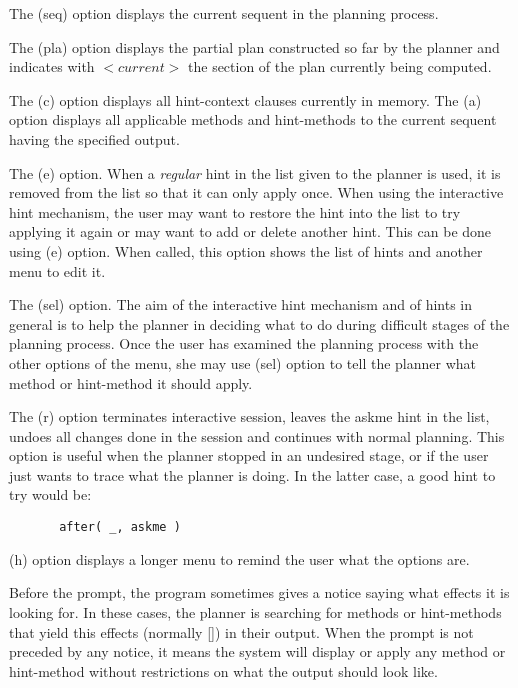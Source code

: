         The (seq) option displays the current sequent in the planning
process.

        
        The (pla) option displays the partial plan constructed so far
by the planner and indicates with $<current>$ the section of the plan
currently being computed.

        The (c) option displays all hint-context clauses currently in
memory.
        The (a) option displays all applicable methods and
hint-methods to the current sequent having the specified output.

       
        The (e) option. When a {\em regular\/} hint in the list given
to the planner is used, it is removed from the list so that it can only
apply once. When using the interactive hint mechanism, the user may
want to restore the hint into the list to try applying it again or may
want to add or delete another hint. This can be done using (e) option.
When called, this option shows the list of hints and another menu to
edit it. 

        
        The (sel) option. The aim of the interactive hint mechanism and
of hints in general is to help the planner in deciding what to do
during difficult stages of the planning process. Once the user has
examined the planning process with the other options of the menu, she
may use (sel) option to tell the planner what method or hint-method it
should apply.

        The (r) option terminates interactive session, leaves the askme
hint in the list, undoes all changes done in the session and continues
with normal planning. This option is useful when the planner stopped in
an undesired stage, or if the user just wants to trace what the planner
is doing. In the latter case, a good hint to try would be:


\begin{verbatim}
       after( _, askme )
\end{verbatim}

        (h) option displays a longer menu to remind the user what the
options are.


        Before the prompt, the program sometimes gives a notice saying
what effects it is looking for. In these cases, the planner is
searching for methods or hint-methods that yield this effects (normally
[]) in their output. When the prompt is not preceded by any notice, it
means the system will display or apply any method or hint-method
without  restrictions on what the output should look like.


